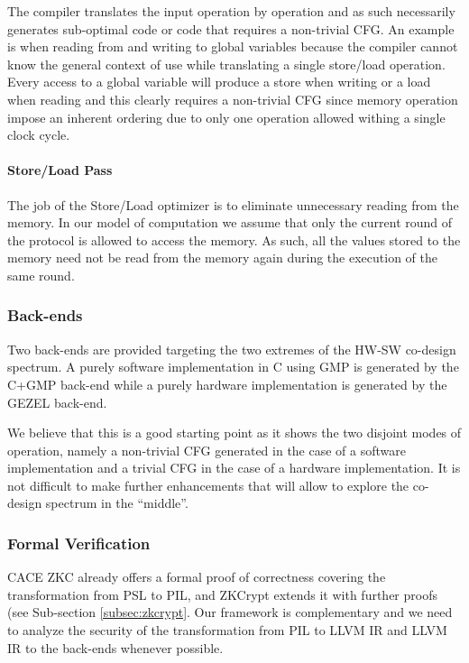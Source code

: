 The compiler translates the input operation by operation and as such
necessarily generates sub-optimal code or code that requires a
non-trivial CFG. An example is when reading from and writing to global
variables because the compiler cannot know the general context of use
while translating a single store/load operation. Every access to a
global variable will produce a store when writing or a load when
reading and this clearly requires a non-trivial CFG since memory
operation impose an inherent ordering due to only one operation
allowed withing a single clock cycle.

\paragraph{Store/Load Pass}
The job of the Store/Load optimizer is to eliminate unnecessary
reading from the memory. In our model of computation we assume that
only the current round of the protocol is allowed to access the
memory. As such, all the values stored to the memory need not be read
from the memory again during the execution of the same round.

\subsubsection{Back-ends}

Two back-ends are provided targeting the two extremes of the HW-SW
co-design spectrum. A purely software implementation in C using GMP is
generated by the C+GMP back-end while a purely hardware implementation
is generated by the GEZEL back-end.

We believe that this is a good starting point as it shows the two
disjoint modes of operation, namely a non-trivial CFG generated in the
case of a software implementation and a trivial CFG in the case of a
hardware implementation. It is not difficult to make further
enhancements that will allow to explore the co-design spectrum in the
``middle''.

\subsubsection{Formal Verification}

CACE ZKC already offers a formal proof of correctness covering the
transformation from PSL to PIL, and ZKCrypt extends it with further
proofs (see Sub-section \ref{subsec:zkcrypt}. Our framework is
complementary and we need to analyze the security of the
transformation from PIL to LLVM IR and LLVM IR to the back-ends
whenever possible.

